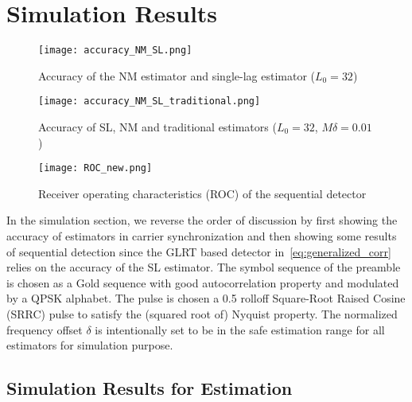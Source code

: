 \section{Simulation Results}%
\label{sec:simulations}

\begin{figure}[t]
    \centerline{\texttt{[image: accuracy\_NM\_SL.png]}}
    \caption{Accuracy of the NM estimator and single-lag estimator ($L_0=32$)}
    \label{fig:accuracy_NM_SL}
    \end{figure}

\begin{figure}[t]
    \centerline{\texttt{[image: accuracy\_NM\_SL\_traditional.png]}}
    \caption{Accuracy of SL, NM and traditional estimators ($L_0=32$, $M\delta=0.01$)}
    \label{fig:accuracy_NM_SL_traditional}
    \end{figure}

\begin{figure}[t]
    \centerline{\texttt{[image: ROC\_new.png]}}
    \caption{Receiver operating characteristics (ROC) of the sequential detector}
    \label{fig:Receiver operating characteristics}
    \end{figure}

In the simulation section, we reverse the order of discussion by first showing 
the accuracy of estimators in carrier synchronization and then showing some results of sequential detection since
the GLRT based detector in~\eqref{eq:generalized_corr} relies on the accuracy of 
the SL estimator. The symbol sequence of the preamble is chosen as a Gold sequence 
with good autocorrelation property and
modulated by a QPSK alphabet.
The pulse is chosen a 0.5
rolloff Square-Root Raised Cosine (SRRC) pulse to satisfy the (squared root of) Nyquist property.
The normalized frequency offset $\delta$ is intentionally set to be in the safe estimation range for all estimators for simulation purpose.

\subsection{Simulation Results for Estimation}


